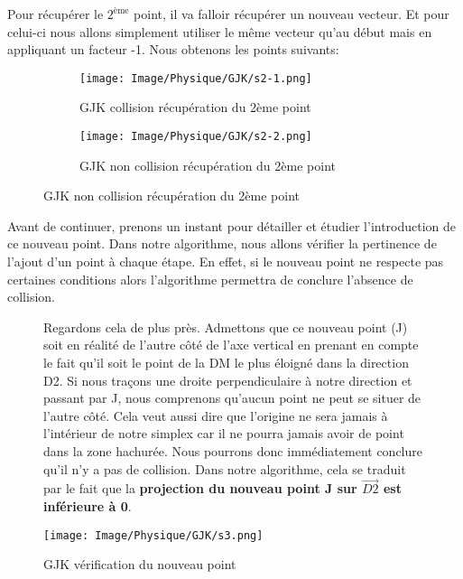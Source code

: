 \noindent Pour récupérer le $2^{\text{ème}}$ point, il va falloir récupérer un nouveau vecteur. Et pour celui-ci nous allons simplement utiliser le même vecteur qu'au début mais en appliquant un facteur -1. Nous obtenons les points suivants: 

\begin{figure}[h!]
	\begin{subfigure}{0.4\linewidth}
		\texttt{[image: Image/Physique/GJK/s2-1.png]}
		\caption{GJK collision récupération du 2ème point}
		\label{fig:GJK collision récupération du 2ème point}
	\end{subfigure}
	\hfill
	\begin{subfigure}{0.4\linewidth}
		\texttt{[image: Image/Physique/GJK/s2-2.png]}
		\caption{GJK non collision récupération du 2ème point}
		\label{fig:GJK non collision récupération du 2ème point}
	\end{subfigure}
\end{figure}

Avant de continuer, prenons un instant pour détailler et étudier l'introduction de ce nouveau point. Dans notre algorithme, nous allons vérifier la pertinence de l'ajout d'un point à chaque étape. En effet, si le nouveau point ne respecte pas certaines conditions alors l'algorithme permettra de conclure l'absence de collision. 

\begin{figure}[h!]
	\begin{minipage}{0.6\linewidth}
		Regardons cela de plus près. Admettons que ce nouveau point (J) soit en réalité de l'autre côté de l'axe vertical en prenant en compte le fait qu'il soit le point de la DM le plus éloigné dans la direction D2. Si nous traçons une droite perpendiculaire à notre direction et passant par J, nous comprenons qu'aucun point ne peut se situer de l'autre côté. Cela veut aussi dire que l'origine ne sera jamais à l'intérieur de notre simplex car il ne pourra jamais avoir de point dans la zone hachurée. Nous pourrons donc immédiatement conclure qu'il n'y a pas de collision. Dans notre algorithme, cela se traduit par le fait que la\textbf{ projection du nouveau point J sur $\vec{D2}$ est inférieure à 0}.
	\end{minipage}
	\hfill 
	\begin{minipage}{0.35\linewidth}
		\texttt{[image: Image/Physique/GJK/s3.png]}
		\caption{GJK vérification du nouveau point}
		\label{fig:GJK vérification du nouveau point}
	\end{minipage}
\end{figure}

